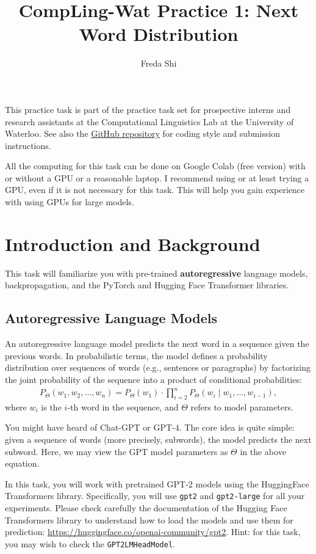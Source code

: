 \documentclass[12pt, letterpaper]{article}
\begin{document}
\title{CompLing-Wat Practice 1: Next Word Distribution}
\author{Freda Shi}
\maketitle

This practice task is part of the practice task set for prospective interns and research assistants at the Computational Linguistics Lab at the University of Waterloo.
See also the \href{https://github.com/compling-wat/ura-practice}{GitHub repository} for coding style and submission instructions.

All the computing for this task can be done on Google Colab (free version) with or without a GPU or a reasonable laptop.
I recommend using or at least trying a GPU, even if it is not necessary for this task.
This will help you gain experience with using GPUs for large models.

\section{Introduction and Background}
This task will familiarize you with pre-trained \textbf{autoregressive} language models, backpropagation, and the PyTorch and Hugging Face Transformer libraries.
\subsection{Autoregressive Language Models}
An autoregressive language model predicts the next word in a sequence given the previous words.
In probabilistic terms, the model defines a probability distribution over sequences of words (e.g., sentences or paragraphs) by factorizing the joint probability of the sequence into a product of conditional probabilities:
\begin{align*}
    P_\Theta(w_1, w_2, \ldots, w_n) = P_\Theta(w_1) \cdot \prod_{i=2}^n P_\Theta(w_i \mid w_1, \ldots, w_{i-1}),
\end{align*}
where $w_i$ is the $i$-th word in the sequence, and $\Theta$ refers to model parameters.

You might have heard of Chat-GPT or GPT-4.
The core idea is quite simple: given a sequence of words (more precisely, subwords), the model predicts the next subword.
Here, we may view the GPT model parameters as $\Theta$ in the above equation.

In this task, you will work with pretrained GPT-2 models using the HuggingFace Transformers library.
Specifically, you will use \texttt{gpt2} and \texttt{gpt2-large} for all your experiments.
Please check carefully the documentation of the Hugging Face Transformers library to understand how to load the models and use them for prediction: \url{https://huggingface.co/openai-community/gpt2}.
Hint: for this task, you may wish to check the \texttt{GPT2LMHeadModel}.
\end{document}
